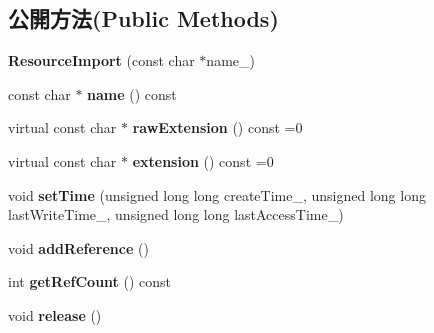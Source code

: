 \subsection*{公開方法(Public Methods)}
\begin{DoxyCompactItemize}
\item 
{\bfseries Resource\+Import} (const char $\ast$name\+\_\+)\hypertarget{class_magnum_1_1_resource_import_a08c27c12f938c6e1e50b0b9ad0de2686}{}\label{class_magnum_1_1_resource_import_a08c27c12f938c6e1e50b0b9ad0de2686}

\item 
const char $\ast$ {\bfseries name} () const \hypertarget{class_magnum_1_1_resource_import_a40a941be8c96ee86b9da7d36f552f750}{}\label{class_magnum_1_1_resource_import_a40a941be8c96ee86b9da7d36f552f750}

\item 
virtual const char $\ast$ {\bfseries raw\+Extension} () const  =0\hypertarget{class_magnum_1_1_resource_import_a2f96e7f90a7f19623f0a4cedebd682d3}{}\label{class_magnum_1_1_resource_import_a2f96e7f90a7f19623f0a4cedebd682d3}

\item 
virtual const char $\ast$ {\bfseries extension} () const  =0\hypertarget{class_magnum_1_1_resource_import_ab7edfd7435c34114b3190d889fbd0945}{}\label{class_magnum_1_1_resource_import_ab7edfd7435c34114b3190d889fbd0945}

\item 
void {\bfseries set\+Time} (unsigned long long create\+Time\+\_\+, unsigned long long last\+Write\+Time\+\_\+, unsigned long long last\+Access\+Time\+\_\+)\hypertarget{class_magnum_1_1_resource_import_a7703f62852cafc0ea74e05d9b4bf4510}{}\label{class_magnum_1_1_resource_import_a7703f62852cafc0ea74e05d9b4bf4510}

\item 
void {\bfseries add\+Reference} ()\hypertarget{class_magnum_1_1_resource_import_ae9120eeedaafe8356135aa602ee3809d}{}\label{class_magnum_1_1_resource_import_ae9120eeedaafe8356135aa602ee3809d}

\item 
int {\bfseries get\+Ref\+Count} () const \hypertarget{class_magnum_1_1_resource_import_acf0640bd2e444d7f31e07b3c6edc63c9}{}\label{class_magnum_1_1_resource_import_acf0640bd2e444d7f31e07b3c6edc63c9}

\item 
void {\bfseries release} ()\hypertarget{class_magnum_1_1_resource_import_abbeaba5a3809198c6f2abf918a2b4713}{}\label{class_magnum_1_1_resource_import_abbeaba5a3809198c6f2abf918a2b4713}

\end{DoxyCompactItemize}
